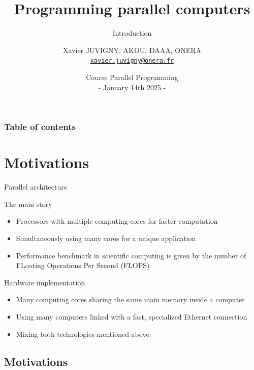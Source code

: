 \documentclass[compress,10pt,aspectratio=169]{beamer}
\title[Parallel programming\hspace{2em}]{Programming parallel computers}
\subtitle{Introduction}
\author[X. JUVIGNY]{Xavier JUVIGNY, AKOU, DAAA, ONERA\\ \href{mailto:xavier.juvigny@onera.fr}{\texttt{xavier.juvigny@onera.fr}} }
\date[01/14/2025]{Course Parallel Programming\\- January 14th 2025 -}
\institute{\inst{1}ONERA,\inst{2}DAAA}
\begin{document}
\MakeTitlePage

\begin{frame}
\frametitle{Table of contents}
\tableofcontents[hideallsubsections]
\end{frame}

\section{Motivations}

\begin{frame}[fragile]{Parallel architecture}
    \small
    \begin{block}{The main story}
        \begin{itemize}
            \item Processors with multiple computing cores for faster computation
            \item Simultaneously using many cores for a unique application
            \item Performance benchmark in scientific computing is given by the number of FLoating Operations Per Second (FLOPS)
        \end{itemize}
    \end{block}

    \begin{exampleblock}{Hardware implementation}
        \begin{itemize}
            \item Many computing cores sharing the same main memory inside a computer
            \item Using many computers linked with a fast, specialized Ethernet connection
            \item Mixing both technologies mentioned above.
        \end{itemize}
    \end{exampleblock}
\end{frame}

\subsection{Motivations}
\end{document}
